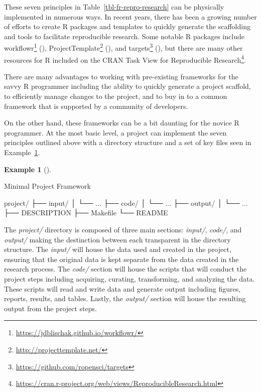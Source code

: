 \documentclass[
  letterpaper,
  DIV=11,
  numbers=noendperiod]{scrreprt}
\newenvironment{Shaded}{\begin{snugshade}}{\end{snugshade}}
\newcommand{\ExtensionTok}[1]{\textcolor[rgb]{0.00,0.00,0.00}{#1}}
\newcommand{\NormalTok}[1]{\textcolor[rgb]{0.00,0.00,0.00}{#1}}
\theoremstyle{definition}
\newtheorem{example}{Example}[chapter]
\theoremstyle{remark}
\DeclareRobustCommand{\href}[2]{#2\footnote{\url{#1}}}
\begin{document}
These seven principles in Table~\ref{tbl-fr-repro-research} can be
physically implemented in numerous ways. In recent years, there has been
a growing number of efforts to create R packages and templates to
quickly generate the scaffolding and tools to facilitate reproducible
research. Some notable R packages include
\href{https://jdblischak.github.io/workflowr/}{workflowr}
(), \href{http://projecttemplate.net/}{ProjectTemplate}
(), and
\href{https://github.com/ropensci/targets}{targets}
(), but there are many other
resources for R included on the
\href{https://cran.r-project.org/web/views/ReproducibleResearch.html}{CRAN
Task View for Reproducible Research}.

There are many advantages to working with pre-existing frameworks for
the savvy R programmer including the ability to quickly generate a
project scaffold, to efficiently manage changes to the project, and to
buy in to a common framework that is supported by a community of
developers.

On the other hand, these frameworks can be a bit daunting for the novice
R programmer. At the most basic level, a project can implement the seven
principles outlined above with a directory structure and a set of key
files seen in Example~\ref{exm-fr-basic-project}.

\begin{example}[]\protect\hypertarget{exm-fr-basic-project}{}\label{exm-fr-basic-project}

Minimal Project Framework

\begin{Shaded}
\begin{Highlighting}[]
\ExtensionTok{project/}
\ExtensionTok{├──}\NormalTok{ input/}
\ExtensionTok{│}\NormalTok{   └── ...}
\ExtensionTok{├──}\NormalTok{ code/}
\ExtensionTok{│}\NormalTok{   └── ...}
\ExtensionTok{├──}\NormalTok{ output/}
\ExtensionTok{│}\NormalTok{   └── ...}
\ExtensionTok{├──}\NormalTok{ DESCRIPTION}
\ExtensionTok{├──}\NormalTok{ Makefile}
\ExtensionTok{└──}\NormalTok{ README}
\end{Highlighting}
\end{Shaded}

\end{example}

The \emph{project/} directory is composed of three main sections:
\emph{input/}, \emph{code/}, and \emph{output/} making the destinction
between each transparent in the directory structure. The \emph{input/}
will house the data used and created in the project, ensuring that the
original data is kept separate from the data created in the research
process. The \emph{code/} section will house the scripts that will
conduct the project steps including acquiring, curating, transforming,
and analyzing the data. These scripts will read and write data and
generate output including figures, reports, results, and tables. Lastly,
the \emph{output/} section will house the resulting output from the
project steps.
\end{document}
